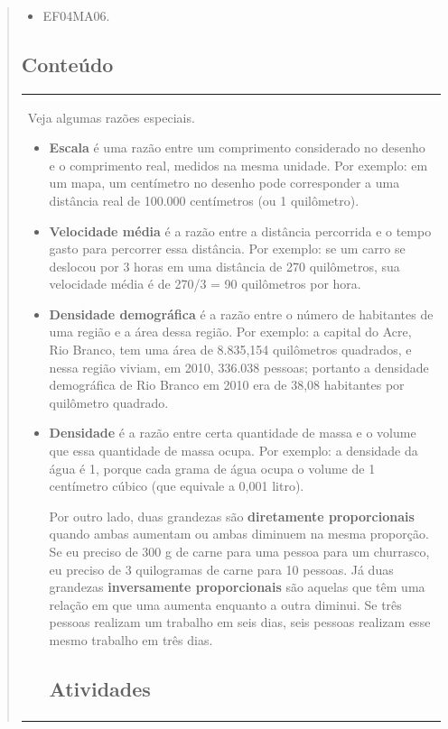 \begin{enumerate}
\begin{escolha}
\begin{enumerate}
\begin{itemize}
\begin{itemize}
\begin{escolha}
\begin{quote}
\begin{escolha}
{

\begin{itemize}
\item EF04MA06.
\end{itemize}

\subsection{Conteúdo}\label{conteuxfado-9}

\begin{longtable}[]{@{}l@{}}
Veja algumas razões especiais.

\begin{itemize}
  \item \textbf{Escala} é uma razão entre um comprimento considerado no desenho e o comprimento real, medidos na mesma unidade. Por exemplo: em um mapa, um centímetro no desenho pode corresponder a uma distância real de 100.000 centímetros (ou 1 quilômetro).
  \item \textbf{Velocidade média} é a razão entre a distância percorrida e o tempo gasto para percorrer essa distância. Por exemplo: se um carro se deslocou por 3 horas em uma distância de 270 quilômetros, sua velocidade média é de 270/3 = 90 quilômetros por hora.
  \item \textbf{Densidade demográfica} é a razão entre o número de habitantes de uma região e a área dessa região. Por exemplo: a capital do Acre, Rio Branco, tem uma área de 8.835,154 quilômetros quadrados, e nessa região viviam, em 2010, 336.038 pessoas; portanto a densidade demográfica de Rio Branco em 2010 era de 38,08 habitantes por quilômetro quadrado.
  \item \textbf{Densidade} é a razão entre certa quantidade de massa e o volume que essa quantidade de massa ocupa. Por exemplo: a densidade da água é 1, porque cada grama de água ocupa o volume de 1 centímetro cúbico (que equivale a 0,001 litro).

Por outro lado, duas grandezas são \textbf{diretamente proporcionais} quando ambas aumentam ou ambas diminuem na mesma proporção. Se eu preciso de 300 g de carne para uma pessoa para um churrasco, eu preciso de 3 quilogramas de carne para 10 pessoas. Já duas grandezas \textbf{inversamente proporcionais} são aquelas que têm uma relação em que uma aumenta enquanto a outra diminui. Se três pessoas realizam um trabalho em seis dias, seis pessoas realizam esse mesmo trabalho em três dias.

\subsection{Atividades}\label{atividades-9}


\end{itemize}
\end{longtable}}
\end{escolha}
\end{quote}
\end{escolha}
\end{itemize}
\end{itemize}
\end{enumerate}
\end{escolha}
\end{enumerate}

